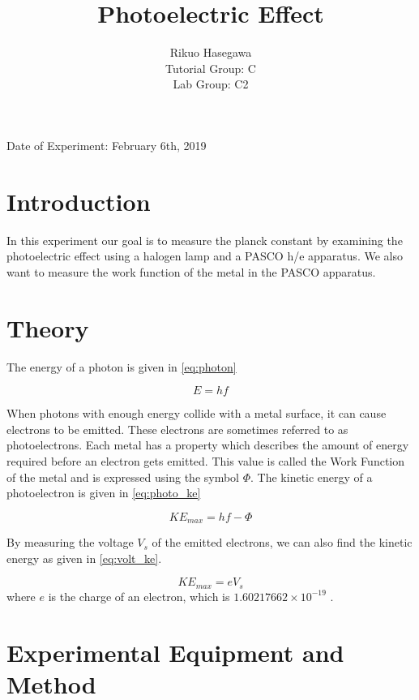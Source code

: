 \documentclass{article}
\title{Photoelectric Effect}
\author{ Rikuo Hasegawa
  \\ Tutorial Group: C
  \\ Lab Group: C2 }
\begin{document}
\maketitle
\thispagestyle{fancy}
\vspace*{\fill}
\parbox{\linewidth}{\centering%
Date of Experiment: February 6th, 2019
}
\newpage


\section{Introduction}

In this experiment our goal is to measure the planck constant by examining the photoelectric effect using a halogen lamp and a PASCO h/e apparatus. We also want to measure the work function of the metal in the PASCO apparatus.

\section{Theory}

The energy of a photon is given in \eqref{eq:photon}

\begin{equation}\label{eq:photon}
  E = hf
\end{equation}

When photons with enough energy collide with a metal surface, it can cause electrons to be emitted. These electrons are sometimes referred to as photoelectrons. Each metal has a property which describes the amount of energy required before an electron gets emitted. This value is called the Work Function of the metal and is expressed using the symbol $\Phi$. The kinetic energy of a photoelectron is given in \eqref{eq:photo_ke}

\begin{equation}\label{eq:photo_ke}
  KE_{max} = hf - \Phi
\end{equation}

By measuring the voltage $V_s$ of the emitted electrons, we can also find the kinetic energy as given in \eqref{eq:volt_ke}.

\begin{equation}\label{eq:volt_ke}
  KE_{max} = e V_s
\end{equation}
where $e$ is the charge of an electron, which is $1.60217662 \times 10^{-19}$ \autocite{mohr_2016}.

\section{Experimental Equipment and Method}
\end{document}
